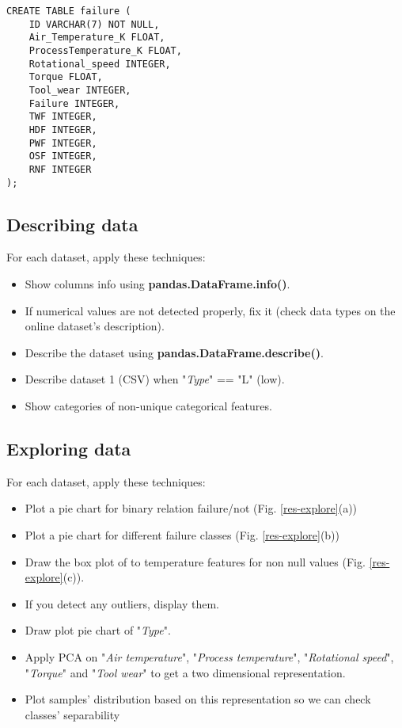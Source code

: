 \documentclass[11pt, a4paper]{article}
\begin{document}
\begin{multicols}{2}
\begin{verbatim}
CREATE TABLE failure (
    ID VARCHAR(7) NOT NULL,
    Air_Temperature_K FLOAT,
    ProcessTemperature_K FLOAT,
    Rotational_speed INTEGER,
    Torque FLOAT,
    Tool_wear INTEGER,
    Failure INTEGER,
    TWF INTEGER,
    HDF INTEGER,
    PWF INTEGER,
    OSF INTEGER,
    RNF INTEGER
);
\end{verbatim}

\subsection{Describing data}

For each dataset, apply these techniques:
\begin{itemize}
	\item Show columns info using \textbf{pandas.DataFrame.info()}.
	\item If numerical values are not detected properly, fix it (check data types on the online dataset's description).
	\item Describe the dataset using \textbf{pandas.DataFrame.describe()}.
	\item Describe dataset 1 (CSV) when "\textit{Type}" == "L" (low).
	\item Show categories of non-unique categorical features.
\end{itemize}

\subsection{Exploring data}

For each dataset, apply these techniques:
\begin{itemize}
	\item Plot a pie chart for binary relation failure/not (Fig. \ref{res-explore}(a))
	\item Plot a pie chart for different failure classes (Fig. \ref{res-explore}(b))
	\item Draw the box plot of to temperature features for non null values (Fig. \ref{res-explore}(c)).
	\item If you detect any outliers, display them.
	\item Draw plot pie chart of "\textit{Type}".
	\item Apply PCA on "\textit{Air temperature}", "\textit{Process temperature}", "\textit{Rotational speed}", "\textit{Torque}" and "\textit{Tool wear}" to get a two dimensional representation. 
	\item Plot samples' distribution based on this representation so we can check classes' separability
\end{itemize}

\end{multicols}
\end{document}
